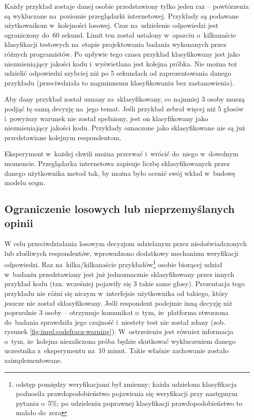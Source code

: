 \documentclass[twoside]{praca}
\begin{document}
Każdy przykład zostaje danej osobie przedstawiony tylko jeden raz -- powtórzenia są wykluczane na~poziomie przeglądarki internetowej. Przykłady są podawane użytkownikom w~kolejności losowej. Czas na~udzielenie odpowiedzi jest ograniczony do~60 sekund. Limit ten został ustalony w~oparciu o~kilkanaście klasyfikacji testowych na~etapie projektowania badania wykonanych przez różnych programistów. Po upływie tego czasu przykład klasyfikowany jest jako niezmieniający jakości kodu i~wyświetlana jest kolejna próbka. Nie można też udzielić odpowiedzi szybciej niż po 5 sekundach od zaprezentowania danego przykładu (przeciwdziała to nagminnemu klasyfikowaniu bez zastanowienia).

Aby dany przykład został uznany za~sklasyfikowany, co najmniej 3 osoby muszą podjąć tę samą decyzję na~jego temat. Jeśli przykład zebrał więcej niż 5 głosów i~powyższy warunek nie został spełniony, jest on klasyfikowany jako niezmieniający jakości kodu. Przykłady oznaczone jako sklasyfikowane nie są już przedstawiane kolejnym respondentom.

Eksperyment w~każdej chwili można przerwać i~wrócić do~niego w~dowolnym momencie. Przeglądarka internetowa zapisuje liczbę sklasyfikowanych przez danego użytkownika metod tak, by można było ocenić swój wkład w~budowę modelu \gls{scqm}.

\subsection{Ograniczenie losowych lub nieprzemyślanych opinii}

W celu przeciwdziałania losowym decyzjom udzielanym przez niedoświadczonych lub złośliwych respondentów, wprowadzono dodatkowy mechanizm weryfikacji odpowiedzi. Raz na~kilka/kilkanaście przykładów\footnote{odstęp pomiędzy weryfikacjami był zmienny; każda udzielona klasyfikacja podnosiła prawdopodobieństwo pojawienia się weryfikacji przy następnym pytaniu o~5\%; po udzieleniu poprawnej klasyfikacji prawdopodobieństwo to malało do~zera} osobie biorącej udział w~badaniu przedstawiany jest już jednoznacznie sklasyfikowany przez innych przykład kodu (tzn. wcześniej pojawiły się 3 takie same głosy). Prezentacja tego przykładu nie różni się niczym w~interfejsie użytkownika od takiego, który jeszcze nie został sklasyfikowany. Jeśli respondent podejmie inną decyzję niż poprzednie 3 osoby -- otrzymuje komunikat o~tym, że~platforma stworzona do~badania sprawdziła jego czujność i~niestety test nie został zdany (zob. rysunek \ref{fig:impl:codefracz-warning}). W~ostrzeżeniu jest również informacja o~tym, że~kolejna niezaliczona próba będzie skutkować wykluczeniem danego uczestnika z~eksperymentu na~10 minut. Takie właśnie zachowanie zostało zaimplementowane.
\end{document}
